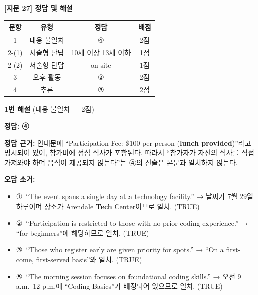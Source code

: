 \documentclass[11pt,a4paper]{article}
\begin{document}
\begin{center}
{\fontsize{15}{17}\selectfont\sffamily\bfseries [지문 27] 정답 및 해설}
\end{center}
\vspace{6pt}

\begin{center}
\begin{tabular}{|c|c|c|c|}
\hline
\textbf{문항} & \textbf{유형} & \textbf{정답} & \textbf{배점} \\
\hline
1 & 내용 불일치 & ④ & 2점 \\
\hline
2-(1) & 서술형 단답 & 10세 이상 13세 이하 & 1점 \\
\hline
2-(2) & 서술형 단답 & on site & 1점 \\
\hline
3 & 오후 활동 & ② & 2점 \\
\hline
4 & 추론 & ③ & 2점 \\
\hline
\end{tabular}
\end{center}

\vspace{10pt}

{\sffamily\bfseries 1번 해설} (내용 불일치 — 2점)

\vspace{4pt}
\noindent \textbf{정답: ④}

\vspace{4pt}
\noindent \textbf{정답 근거:} 안내문에 ``Participation Fee: \$100 per person (\textbf{lunch provided})''라고 명시되어 있어,
참가비에 점심 식사가 포함된다. 따라서 ``참가자가 자신의 식사를 직접 가져와야 하며 음식이 제공되지 않는다''는 ④의 진술은 본문과 일치하지 않는다.

\vspace{6pt}
\noindent \textbf{오답 소거:}
\begin{itemize}[leftmargin=2em,itemsep=2pt,topsep=3pt,parsep=0pt]
  \item ①\ ``The event spans a single day at a technology facility.'' → 날짜가 7월 29일 하루이며 장소가 Arendale \textbf{Tech} Center이므로 일치. (TRUE)
  \item ②\ ``Participation is restricted to those with no prior coding experience.'' → ``for beginners''에 해당하므로 일치. (TRUE)
  \item ③\ ``Those who register early are given priority for spots.'' → ``On a first-come, first-served basis''와 일치. (TRUE)
  \item ⑤\ ``The morning session focuses on foundational coding skills.'' → 오전 9 a.m.--12 p.m.에 ``Coding Basics''가 배정되어 있으므로 일치. (TRUE)
\end{itemize}
\end{document}
